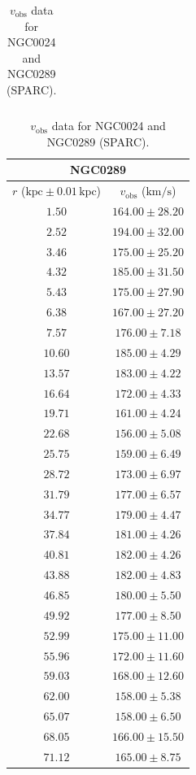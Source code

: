 \documentclass{article}
\newcommand\kpc{\textrm{kpc}}
\newcommand\kmps{\textrm{km}/\textrm{s}}
\newcommand\vobs{\ensuremath{v_{\textrm{obs}}}}
\begin{document}
\begin{table}[h!]
\begin{tabular}{|c|c|}
    \end{tabular}
    \hfill
    \begin{tabular}{|c|c|}
        \hline
        \multicolumn{2}{|c|}{NGC0289} \\
        \hline
        $r$ ($\kpc \pm 0.01 \,\kpc$) & $\vobs$ ($\kmps$) \\
        \hline
        $1.50$ & $164.00 \pm 28.20$ \\
        $2.52$ & $194.00 \pm 32.00$ \\
        $3.46$ & $175.00 \pm 25.20$ \\
        $4.32$ & $185.00 \pm 31.50$ \\
        $5.43$ & $175.00 \pm 27.90$ \\
        $6.38$ & $167.00 \pm 27.20$ \\
        $7.57$ & $176.00 \pm 7.18$ \\
        $10.60$ & $185.00 \pm 4.29$ \\
        $13.57$ & $183.00 \pm 4.22$ \\
        $16.64$ & $172.00 \pm 4.33$ \\
        $19.71$ & $161.00 \pm 4.24$ \\
        $22.68$ & $156.00 \pm 5.08$ \\
        $25.75$ & $159.00 \pm 6.49$ \\
        $28.72$ & $173.00 \pm 6.97$ \\
        $31.79$ & $177.00 \pm 6.57$ \\
        $34.77$ & $179.00 \pm 4.47$ \\
        $37.84$ & $181.00 \pm 4.26$ \\
        $40.81$ & $182.00 \pm 4.26$ \\
        $43.88$ & $182.00 \pm 4.83$ \\
        $46.85$ & $180.00 \pm 5.50$ \\
        $49.92$ & $177.00 \pm 8.50$ \\
        $52.99$ & $175.00 \pm 11.00$ \\
        $55.96$ & $172.00 \pm 11.60$ \\
        $59.03$ & $168.00 \pm 12.60$ \\
        $62.00$ & $158.00 \pm 5.38$ \\
        $65.07$ & $158.00 \pm 6.50$ \\
        $68.05$ & $166.00 \pm 15.50$ \\
        $71.12$ & $165.00 \pm 8.75$ \\
        \hline
    \end{tabular}
    \caption{$\vobs$ data for NGC0024 and NGC0289 (SPARC).}
    \label{tab:raw0024,0289}
\end{table}
\end{document}
